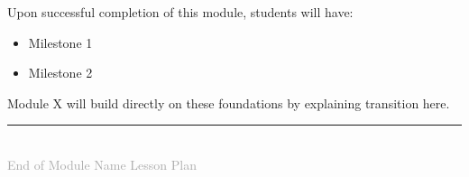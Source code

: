 \documentclass[11pt,letterpaper]{article}
\begin{document}
	Upon successful completion of this module, students will have:
	\begin{itemize}[leftmargin=2em]
		\item Milestone 1
		\item Milestone 2
	\end{itemize}
	
	Module X will build directly on these foundations by explaining transition here.
	
	\vfill
	\begin{center}
		\rule{0.5\textwidth}{0.4pt}\\[6pt]
		{\small\textcolor{darkgray}{End of Module Name Lesson Plan}}
	\end{center}
	
\end{document}
